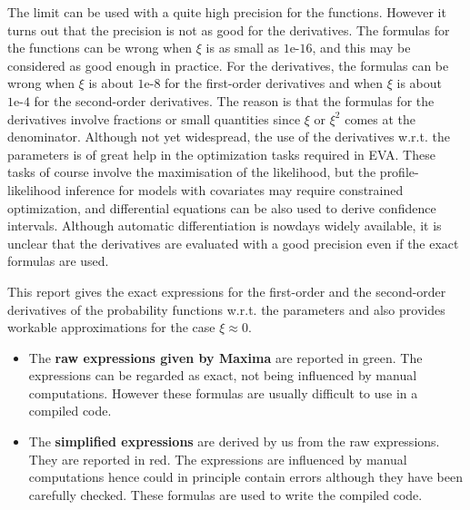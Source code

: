 \documentclass[11pt]{article}\usepackage[]{graphicx}\usepackage[]{xcolor}
\begin{document}
The limit can be used with a quite high precision for the
functions. However it turns out that the precision is not as good for
the derivatives. The formulas for the functions can be wrong when $\xi$
is as small as $\text{1e-16}$, and this may be considered as good enough in
practice. For the derivatives, the formulas can be wrong when $\xi$ is
about $\text{1e-8}$ for the first-order derivatives and when $\xi$ is
about $\text{1e-4}$ for the second-order derivatives. The reason is
that the formulas for the derivatives involve fractions or small
quantities since $\xi$ or $\xi^2$ comes at the denominator. Although
not yet widespread, the use of the derivatives w.r.t. the parameters
is of great help in the optimization tasks required in EVA. These
tasks of course involve the maximisation of the likelihood, but the
profile-likelihood inference for models with covariates may require
constrained optimization, and differential equations can be also used
to derive confidence intervals. Although automatic differentiation is
nowdays widely available, it is unclear that the derivatives are
evaluated with a good precision even if the exact formulas are used.




This report gives the exact expressions for the first-order and
the second-order derivatives of the probability functions w.r.t. the
parameters and also provides workable approximations for the case
$\xi \approx 0$.

\begin{itemize}
\item The {\color{MonVertF} \bf raw expressions given by Maxima} are reported
  {\color{MonVertF} in green}. The expressions can be regarded
  as exact, not being influenced by manual computations. However
  these formulas are usually difficult to use in a compiled code.

\item The {\color{red} \bf simplified expressions}
  are derived by us from the raw expressions.
  They are reported {\color{red} in red}. The expressions are
  influenced by manual computations hence could in principle contain errors
  although they have been carefully checked. These formulas are used
  to write the compiled code.
  
\end{itemize}
\end{document}
